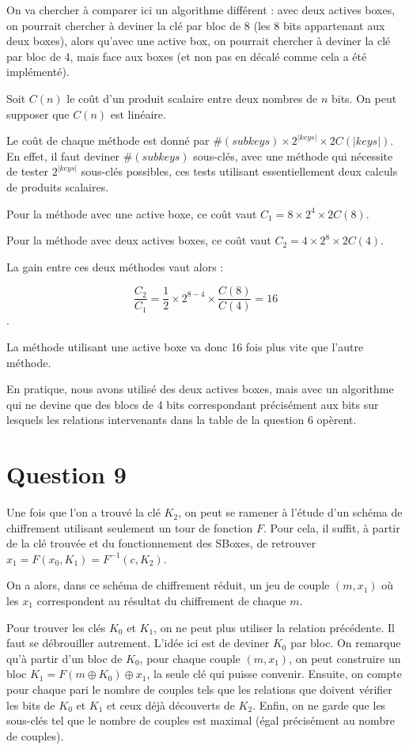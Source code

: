 On va chercher à comparer ici un algorithme différent : avec deux actives boxes, on pourrait chercher à deviner la clé par bloc de 8 (les 8 bits appartenant aux deux boxes), alors qu'avec une active box, on pourrait chercher à deviner la clé par bloc de 4, mais face aux boxes (et non pas en décalé comme cela a été implémenté).

Soit $C(n)$ le coût d'un produit scalaire entre deux nombres de $n$ bits. On peut supposer que $C(n)$ est linéaire.

Le coût de chaque méthode est donné par $ \# (subkeys) \times 2^{ | keys |} \times 2 C( |keys|)$. En effet, il faut deviner $\# (subkeys)$ sous-clés, avec une méthode qui nécessite de tester $2^{ | keys |}$ sous-clés possibles, ces tests utilisant essentiellement deux calculs de produits scalaires.

Pour la méthode avec une active boxe, ce coût vaut $C_1 = 8 \times 2^4 \times 2 C(8)$. 

Pour la méthode avec deux actives boxes, ce coût vaut $C_2 = 4 \times 2^8 \times 2 C(4)$.

La gain entre ces deux méthodes vaut alors :

$$ \frac{C_2}{C_1} = \frac{1}{2} \times 2^{8-4} \times \frac{C(8)}{C(4)} = 16$$.

La méthode utilisant une active boxe va donc 16 fois plus vite que l'autre méthode.

En pratique, nous avons utilisé des deux actives boxes, mais avec un algorithme qui ne devine que des blocs de 4 bits correspondant précisément aux bits sur lesquels les relations intervenants dans la table de la question 6 opèrent.

\section*{Question 9}

Une fois que l'on a trouvé la clé $K_2$, on peut se ramener à l'étude d'un schéma de chiffrement utilisant seulement un tour de fonction $F$. Pour cela, il suffit, à partir de la clé trouvée et du fonctionnement des SBoxes, de retrouver $x_1 = F(x_0,K_1) = F^{-1}(c,K_2)$.

On a alors, dans ce schéma de chiffrement réduit, un jeu de couple $(m,x_1)$ où les $x_1$ correspondent au résultat du chiffrement de chaque $m$.

Pour trouver les clés $K_0$ et $K_1$, on ne peut plus utiliser la relation précédente. Il faut se débrouiller autrement. L'idée ici est de deviner $K_0$ par bloc. On remarque qu'à partir d'un bloc de $K_0$, pour chaque couple $(m,x_1)$, on peut construire un bloc $K_1 = F(m \oplus K_0) \oplus x_1$, la seule clé qui puisse convenir. Ensuite, on compte pour chaque pari le nombre de couples tels que les relations que doivent vérifier les bits de $K_0$ et $K_1$ et ceux déjà découverts de $K_2$. Enfin, on ne garde que les sous-clés tel que le nombre de couples est maximal (égal précisément au nombre de couples).	

